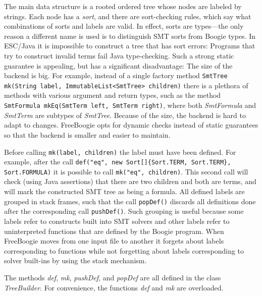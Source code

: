 \documentclass{llncs}
\newcommand{\jmlCode}{\lstinline[style=jml,basicstyle=\normalsize]}
\newcommand{\escjava}{ESC\slash Java\xspace}
\begin{document}
The main data structure is a rooted ordered tree whose nodes are
labeled by strings. Each node has a \emph{sort}, and there are
sort-checking rules, which say what combinations of sorts and
labels are valid. In effect, sorts are types---the only reason a
different name is used is to distinguish SMT sorts from
Boogie types. In \escjava it is impossible to construct a tree
that has sort errors: Programs that try to construct invalid
terms fail Java type-checking. Such a strong static guarantee is
appealing, but has a significant disadvantage: The size of the
backend is big. For example, instead of a single factory method
  \jmlCode|SmtTree mk(String label, ImmutableList<SmtTree> children)|
there is a plethora of methods with various argument and return
types, such as the method
  \jmlCode|SmtFormula mkEq(SmtTerm left, SmtTerm right)|,
where both \textit{SmtFormula} and \textit{SmtTerm} are subtypes
of \textit{SmtTree}. Because of the size, the backend is hard to
adapt to changes. FreeBoogie opts for dynamic checks instead of
static guarantees so that the backend is smaller and easier to
maintain.

Before calling \jmlCode|mk(label, children)| the label must have
been defined. For example, after the call
  \jmlCode|def("eq", new Sort[]{Sort.TERM, Sort.TERM}, Sort.FORMULA)|
it is possible to call
  \jmlCode|mk("eq", children)|.
This second call will check (using Java assertions) that there are
two children and both are terms, and will mark the constructed
SMT tree as being a formula. All defined labels are grouped in
stack frames, such that the call \jmlCode|popDef()| discards
all definitions done after the corresponding call \jmlCode|pushDef()|.
Such grouping is useful because some labels refer to constructs
built into SMT solvers and other labels refer to uninterpreted
functions that are defined by the Boogie program. When
FreeBoogie moves from one input file to another it forgets about
labels corresponding to functions while not forgetting about
labels corresponding to solver built-ins by using the stack
mechanism.

The methods \textit{def}, \textit{mk}, \textit{pushDef}, and
\textit{popDef} are all defined in the class \textit{TreeBuilder}.
For convenience, the functions \textit{def} and \textit{mk} are
overloaded.
\end{document}
